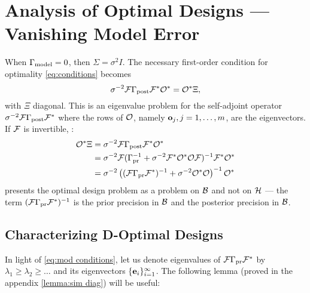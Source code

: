 \documentclass{amsart}
\numberwithin{equation}{section}
\begin{document}
\section{Analysis of Optimal Designs --- Vanishing Model Error}\label{section:vanishing}
When $\Gamma_{\textup{model}} = 0$, then $\Sigma= \sigma^2I$. The necessary
first-order condition for optimality \eqref{eq:conditions} becomes
\begin{equation}\label{eq:eigenproblem}
  \sigma^{-2}\mathcal{F} \Gamma_{\textup{post}} \mathcal{F}^* \mathcal{O}^* = \mathcal{O}^* \Xi, 
\end{equation}
with $\Xi$ diagonal. This is an eigenvalue problem for the
self-adjoint operator $\sigma^{-2}\mathcal{F} \Gamma_{\textup{post}} \mathcal{F}^*$ where the rows
of $\mathcal{O}$, namely $\mathbf{o}_j,j=1,\dots, m$, are the
eigenvectors.  If $\mathcal{F}$ is invertible, :
\begin{align}\label{eq:mod conditions}
  \begin{split}
  \mathcal{O}^* \Xi &= \sigma^{-2}\mathcal{F} \Gamma_{\textup{post}} \mathcal{F}^* \mathcal{O}^*  \\
  &= \sigma^{-2} \mathcal{F}( \Gamma_{\textup{pr}}^{-1} + \sigma^{-2}  \mathcal{F}^* \mathcal{O}^* \mathcal{O} \mathcal{F} )^{-1} \mathcal{F}^* \mathcal{O}^* \\
  &= \sigma^{-2} \left ( (\mathcal{F}\Gamma_{\textup{pr}}\mathcal{F}^*)^{-1} + \sigma^{-2}  \mathcal{O}^* \mathcal{O} \right )^{-1} \mathcal{O}^*
  \end{split}
\end{align}  
 presents the optimal design problem as a
problem on $\mathcal{B}$ and not on $\mathcal{H}$ --- the term $(\mathcal{F} \Gamma_{\textup{pr}}
\mathcal{F}^*)^{-1}$ is the prior precision in $\mathcal{B}$ and  the posterior precision in
$\mathcal{B}$. 

\subsection{Characterizing D-Optimal Designs}\label{subsub:characterization}
In light of \eqref{eq:mod conditions}, let us denote eigenvalues of
$\mathcal{F} \Gamma_{\textup{pr}} \mathcal{F}^*$ by $\lambda_1 \geq \lambda_2 \geq \dots$ and its
eigenvectors $\{\mathbf{e}_i\}_{i=1}^{\infty}$. The following lemma (proved
in the appendix \ref{lemma:sim diag}) will be useful:
\end{document}
